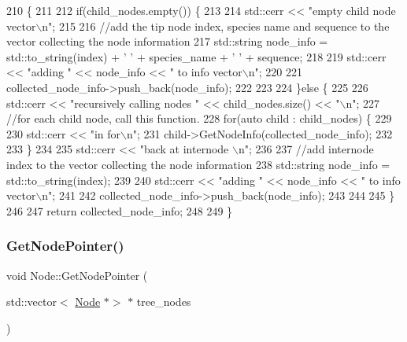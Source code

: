 \begin{DoxyCode}
210                                                                                 \{
211   
212   \textcolor{keywordflow}{if}(child\_nodes.empty()) \{
213     
214     std::cerr << \textcolor{stringliteral}{"empty child node vector\(\backslash\)n"};
215     
216     \textcolor{comment}{//add the tip node index, species name and sequence to the vector collecting the node information}
217     std::string node\_info = std::to\_string(index) + \textcolor{charliteral}{' '} + species\_name + \textcolor{charliteral}{' '} + sequence;
218     
219     std::cerr << \textcolor{stringliteral}{"adding "} << node\_info << \textcolor{stringliteral}{" to info vector\(\backslash\)n"};
220     
221     collected\_node\_info->push\_back(node\_info);
222     
223     
224   \}\textcolor{keywordflow}{else} \{
225     
226     std::cerr << \textcolor{stringliteral}{"recursively calling nodes "} << child\_nodes.size() << \textcolor{stringliteral}{"\(\backslash\)n"};
227     \textcolor{comment}{//for each child node, call this function.}
228     \textcolor{keywordflow}{for}(\textcolor{keyword}{auto} child : child\_nodes) \{
229       
230       std::cerr << \textcolor{stringliteral}{"in for\(\backslash\)n"}; 
231       child->GetNodeInfo(collected\_node\_info);
232       
233     \}
234     
235     std::cerr << \textcolor{stringliteral}{"back at internode \(\backslash\)n"};
236     
237     \textcolor{comment}{//add internode index to the vector collecting the node information}
238     std::string node\_info = std::to\_string(index);
239     
240     std::cerr << \textcolor{stringliteral}{"adding "} << node\_info << \textcolor{stringliteral}{" to info vector\(\backslash\)n"};
241     
242     collected\_node\_info->push\_back(node\_info);
243     
244     
245   \}
246   
247   \textcolor{keywordflow}{return} collected\_node\_info;
248   
249 \}
\end{DoxyCode}
\mbox{\label{classNode_a8e58dc16fc38e2076c7ddbe5b9f04177}} 
\subsubsection{\texorpdfstring{Get\+Node\+Pointer()}{GetNodePointer()}}
{\footnotesize\ttfamily void Node\+::\+Get\+Node\+Pointer (\begin{DoxyParamCaption}\item[{std\+::vector$<$ \hyperlink{classNode}{Node} $\ast$$>$ $\ast$}]{tree\+\_\+nodes }\end{DoxyParamCaption})}



